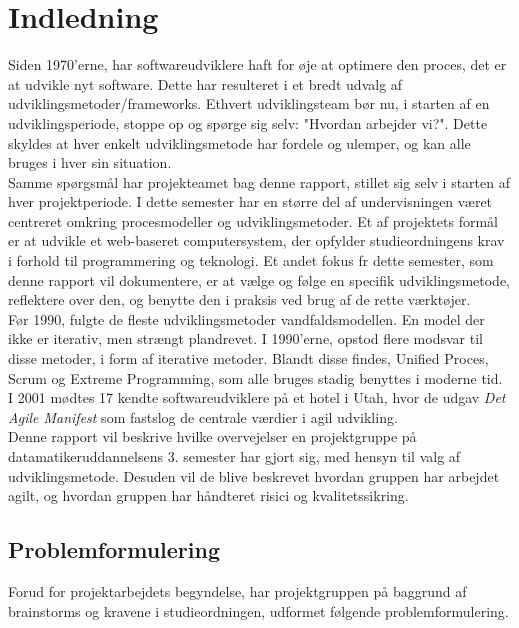 \chapter{Indledning}\label{ch:indledning}
Siden 1970'erne, har softwareudviklere haft for øje at optimere den proces, det er at udvikle nyt software.
Dette har resulteret i et bredt udvalg af udviklingsmetoder/frameworks. Ethvert udviklingsteam bør nu, i starten af en udviklingsperiode,
stoppe op og spørge sig selv: "Hvordan arbejder vi?". Dette skyldes at hver enkelt udviklingsmetode har fordele og ulemper, og kan alle bruges
i hver sin situation. \\

Samme spørgsmål har projekteamet bag denne rapport, stillet sig selv i starten af hver projektperiode. I dette semester har en større del af undervisningen
været centreret omkring procesmodeller og udviklingsmetoder. Et af projektets formål er at udvikle et web-baseret computersystem, der opfylder studieordningens krav
i forhold til programmering og teknologi. Et andet fokus fr dette semester, som denne rapport vil dokumentere, er at vælge og følge en specifik udviklingsmetode, 
reflektere over den, og benytte den i praksis ved brug af de rette værktøjer. \\

Før 1990, fulgte de fleste udviklingsmetoder vandfaldsmodellen. En model der ikke er iterativ, men strængt plandrevet. I 1990'erne, opstod flere modsvar til
disse metoder, i form af iterative metoder. Blandt disse findes, Unified Proces, Scrum og Extreme Programming, som alle bruges stadig benyttes i moderne tid.
I 2001 mødtes 17 kendte softwareudviklere på et hotel i Utah, hvor de udgav \textit{Det Agile Manifest} som fastslog de centrale værdier i agil udvikling. \\

Denne rapport vil beskrive hvilke overvejelser en projektgruppe på datamatikeruddannelsens 3. semester har gjort sig, med hensyn til valg af udviklingsmetode.
Desuden vil de blive beskrevet hvordan gruppen har arbejdet agilt, og hvordan gruppen har håndteret risici og kvalitetssikring.

\newpage
\section{Problemformulering}
Forud for projektarbejdets begyndelse, har projektgruppen på baggrund af brainstorms og kravene i
studieordningen, udformet følgende problemformulering. \\


